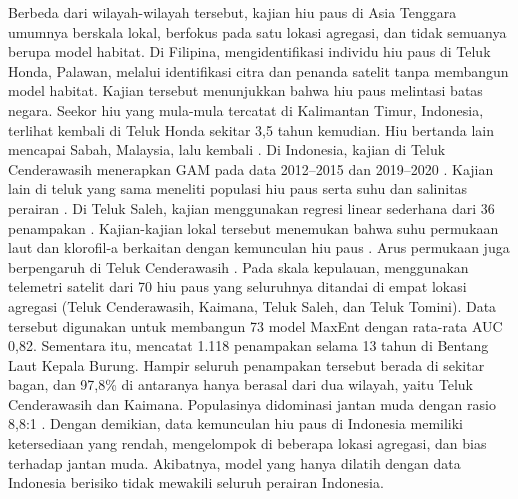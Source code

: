 Berbeda dari wilayah-wilayah tersebut, kajian hiu paus di Asia Tenggara umumnya
berskala lokal, berfokus pada satu lokasi agregasi, dan tidak semuanya berupa
model habitat. Di Filipina, \citet{Araujo2019} mengidentifikasi individu hiu
paus di Teluk Honda, Palawan, melalui identifikasi citra dan penanda satelit
tanpa membangun model habitat. Kajian tersebut menunjukkan bahwa hiu paus
melintasi batas negara. Seekor hiu yang mula-mula tercatat di Kalimantan Timur,
Indonesia, terlihat kembali di Teluk Honda sekitar 3,5 tahun kemudian. Hiu
bertanda lain mencapai Sabah, Malaysia, lalu kembali \citep{Araujo2019}. Di
Indonesia, kajian di Teluk Cenderawasih menerapkan GAM pada data 2012--2015
\citep{Ranintyari2018} dan 2019--2020 \citep{Manuhutu2021}. Kajian lain di
teluk yang sama meneliti populasi hiu paus serta suhu dan salinitas perairan
\citep{Adriani2023}. Di Teluk Saleh, kajian menggunakan regresi linear
sederhana dari 36 penampakan \citep{Herdianti2025}. Kajian-kajian lokal
tersebut menemukan bahwa suhu permukaan laut dan klorofil-a berkaitan dengan
kemunculan hiu paus \citep{Ranintyari2018,Manuhutu2021,Herdianti2025}. Arus
permukaan juga berpengaruh di Teluk Cenderawasih
\citep{Ranintyari2018,Manuhutu2021}. Pada skala kepulauan, \citet{Putra2026}
menggunakan telemetri satelit dari 70 hiu paus yang seluruhnya ditandai di
empat lokasi agregasi (Teluk Cenderawasih, Kaimana, Teluk Saleh, dan Teluk
Tomini). Data tersebut digunakan untuk membangun 73 model MaxEnt dengan
rata-rata AUC 0,82. Sementara itu, \citet{Setyawan2025} mencatat 1.118
penampakan selama 13 tahun di Bentang Laut Kepala Burung. Hampir seluruh
penampakan tersebut berada di sekitar bagan, dan 97,8\% di antaranya hanya
berasal dari dua wilayah, yaitu Teluk Cenderawasih dan Kaimana. Populasinya
didominasi jantan muda dengan rasio 8,8:1 \citep{Setyawan2025}. Dengan
demikian, data kemunculan hiu paus di Indonesia memiliki ketersediaan yang
rendah, mengelompok di beberapa lokasi agregasi, dan bias terhadap jantan muda.
Akibatnya, model yang hanya dilatih dengan data Indonesia berisiko tidak
mewakili seluruh perairan Indonesia.

